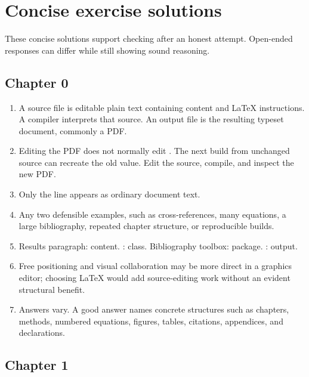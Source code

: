 \chapter*{Concise exercise solutions}

These concise solutions support checking after an honest attempt. Open-ended
responses can differ while still showing sound reasoning.

\section*{Chapter 0}

\begin{enumerate}[label=0.\arabic*,leftmargin=2.4em,itemsep=0.55em]
  \item A source file is editable plain text containing content and \LaTeX{}
        instructions. A compiler interprets that source. An output file is the
        resulting typeset document, commonly a PDF.
  \item Editing the PDF does not normally edit . The next build
        from unchanged source can recreate the old value. Edit the source,
        compile, and inspect the new PDF.
  \item Only the line  appears as ordinary document text.
  \item Any two defensible examples, such as cross-references, many equations,
        a large bibliography, repeated chapter structure, or reproducible
        builds.
  \item Results paragraph: content. : class. Bibliography toolbox:
        package. : output.
  \item Free positioning and visual collaboration may be more direct in a
        graphics editor; choosing \LaTeX{} would add source-editing work without
        an evident structural benefit.
  \item Answers vary. A good answer names concrete structures such as chapters,
        methods, numbered equations, figures, tables, citations, appendices,
        and declarations.
\end{enumerate}

\section*{Chapter 1}

